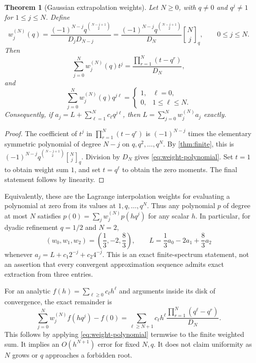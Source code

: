 \documentclass[11pt,a4paper]{article}
\numberwithin{equation}{section}
\newtheorem{theorem}{Theorem}[section]
\theoremstyle{definition}
\theoremstyle{remark}
\newcommand{\qb}[2]{\genfrac{[}{]}{0pt}{}{#1}{#2}_{q}}
\begin{document}
\begin{theorem}[Gaussian extrapolation weights]\label{thm:extrapolation}
Let $N\ge0$, with $q\ne0$ and $q^j\ne1$ for $1\le j\le N$. Define
\begin{equation}\label{eq:weights}
 w_j^{(N)}(q)=
   \frac{(-1)^{N-j}q^{\binom{N-j+1}2}}{D_jD_{N-j}}
 =\frac{(-1)^{N-j}q^{\binom{N-j+1}2}}{D_N}\qb Nj,
 \qquad 0\le j\le N.
\end{equation}
Then
\begin{equation}\label{eq:weight-polynomial}
 \sum_{j=0}^Nw_j^{(N)}(q)t^j
       =\frac{\prod_{r=1}^N(t-q^r)}{D_N},
\end{equation}
and
\begin{equation}\label{eq:annihilation}
 \sum_{j=0}^Nw_j^{(N)}(q)q^{j\ell}
   =\begin{cases}1,&\ell=0,\\0,&1\le\ell\le N.\end{cases}
\end{equation}
Consequently, if $a_j=L+\sum_{\ell=1}^N c_\ell q^{j\ell}$, then
$L=\sum_{j=0}^Nw_j^{(N)}a_j$ exactly.
\end{theorem}
\begin{proof}
The coefficient of $t^j$ in $\prod_{r=1}^N(t-q^r)$ is
$(-1)^{N-j}$ times the elementary symmetric polynomial of degree $N-j$ on
$q,q^2,\ldots,q^N$. By \cref{thm:finite}, this is
$(-1)^{N-j}q^{\binom{N-j+1}2}\qb Nj$.
Division by $D_N$ gives \eqref{eq:weight-polynomial}.
Set $t=1$ to obtain weight sum $1$, and set $t=q^\ell$ to obtain the zero moments.
The final statement follows by linearity.
\end{proof}

Equivalently, these are the Lagrange interpolation weights for evaluating a
polynomial at zero from its values at $1,q,\ldots,q^N$. Thus any polynomial
$p$ of degree at most $N$ satisfies
$p(0)=\sum_jw_j^{(N)}p(hq^j)$ for any scalar $h$.
In particular, for dyadic refinement $q=1/2$ and $N=2$,
\begin{equation}\label{eq:dyadic-weights}
 (w_0,w_1,w_2)=\left(\frac13,-2,\frac83\right),\qquad
 L=\frac13a_0-2a_1+\frac83a_2
\end{equation}
whenever $a_j=L+c_1 2^{-j}+c_2 4^{-j}$.
This is an exact finite-spectrum statement, not an assertion that every
convergent approximation sequence admits exact extraction from three entries.

For an analytic $f(h)=\sum_{\ell\ge0}c_\ell h^\ell$ and arguments inside its disk
of convergence, the exact remainder is
\begin{equation}\label{eq:extrap-error}
 \sum_{j=0}^Nw_j^{(N)}f(hq^j)-f(0)
   =\sum_{\ell\ge N+1}c_\ell h^\ell
       \frac{\prod_{r=1}^N(q^\ell-q^r)}{D_N}.
\end{equation}
This follows by applying \eqref{eq:weight-polynomial} termwise to the finite
weighted sum. It implies an $O(h^{N+1})$ error for fixed $N,q$. It does not claim
uniformity as $N$ grows or $q$ approaches a forbidden root.
\end{document}
